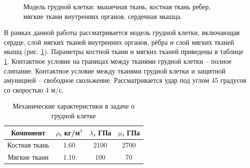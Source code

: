 \begin{figure}[h]
\caption{Модель грудной клетки: мышечная ткань, костная ткань ребер, мягкие ткани внутренних органов, сердечная мышца.}
\label{pic:chest_scheme}
\end{figure}

В рамках данной работы рассматривается модель грудной клетки, включающая сердце, слой мягких тканей внутренних органов, рёбра и слой мягких тканей мышц (рис. \ref{pic:chest_scheme}). Параметры костной ткани и мягких тканей приведены в таблице \ref{tbl:chest_elastic_parameters}. Контактное условие на границах между тканями грудной клетки -- полное слипание. Контактное условие между тканями грудной клетки и защитной амуницией -- свободное скольжение. Рассматривается удар под углом 45 градусов со скоростью 4 м/с. 

\begin{table}[h]
\centering
\caption{Механические характеристики в задаче о грудной клетке}
\begin{tabular}{|c|c|c|c|}
\hline
Компонент & $\rho$, кг/м$^{3}$ & $\lambda$, ГПа & $\mu$, ГПа  \\
\hline
Костная ткань & 1.60 & 2100 & 2700 \\
Мягкие ткани & 1.10 & 100 & 70 \\
\hline
\end{tabular}
\label{tbl:chest_elastic_parameters}
\end{table}


